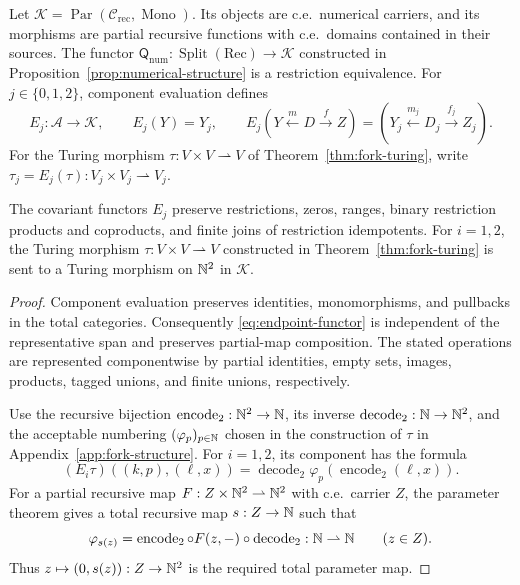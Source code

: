 Let
$\mathcal K=\operatorname{Par}(\mathcal C_{\mathrm{rec}},\operatorname{Mono})$.
Its objects are c.e.\ numerical carriers, and its morphisms are partial
recursive functions with c.e.\ domains contained in their sources.
The functor
$\mathsf Q_{\mathrm{num}}:\operatorname{Split}(\mathrm{Rec})\to\mathcal K$
constructed in Proposition~\ref{prop:numerical-structure} is a
restriction equivalence.
For $j\in\{0,1,2\}$, component evaluation defines
\begin{equation}\label{eq:endpoint-functor}
 E_j:\mathcal A\longrightarrow\mathcal K,\qquad
 E_j(Y)=Y_j,\qquad
 E_j(Y\xleftarrow{m}D\xrightarrow{f}Z)
   =(Y_j\xleftarrow{m_j}D_j\xrightarrow{f_j}Z_j).
\end{equation}
For the Turing morphism $\tau:V\times V\rightharpoonup V$ of
Theorem~\ref{thm:fork-turing}, write
$\tau_j=E_j(\tau):V_j\times V_j\rightharpoonup V_j$.

\begin{proposition}\label{prop:endpoint}
The covariant functors $E_j$ preserve restrictions, zeros, ranges,
binary restriction products and coproducts, and finite joins of
restriction idempotents.
For $i=1,2$, the Turing morphism
$\tau:V\times V\rightharpoonup V$ constructed in
Theorem~\ref{thm:fork-turing} is sent
to a Turing morphism on $\mathbb N^2$ in $\mathcal K$.
\end{proposition}
\begin{proof}
Component evaluation preserves identities, monomorphisms, and
pullbacks in the total categories. Consequently \eqref{eq:endpoint-functor}
is independent of the representative span and preserves partial-map
composition. The stated operations are represented componentwise by
partial identities, empty sets, images, products, tagged unions, and
finite unions, respectively.

Use the recursive bijection $\operatorname{encode}_2:\mathbb N^2\to\mathbb N$,
its inverse $\operatorname{decode}_2:\mathbb N\to\mathbb N^2$, and the acceptable numbering
$(\varphi_p)_{p\in\mathbb N}$ chosen in the construction of $\tau$ in
Appendix~\ref{app:fork-structure}. For $i=1,2$, its component has
the formula
\[
 (E_i\tau)((k,p),(\ell,x))
 =\operatorname{decode}_2\varphi_p(\operatorname{encode}_2(\ell,x)).
\]
For a partial recursive map
$F:Z\times\mathbb N^2\rightharpoonup\mathbb N^2$ with c.e.\ carrier $Z$,
the parameter theorem gives a total recursive map $s:Z\to\mathbb N$ such that
\[
 \varphi_{s(z)}
 =\operatorname{encode}_2\circ F(z,-)\circ\operatorname{decode}_2
 :\mathbb N\rightharpoonup\mathbb N
 \qquad(z\in Z).
\]
Thus $z\mapsto(0,s(z)):Z\to\mathbb N^2$ is the required total parameter map.
\end{proof}


